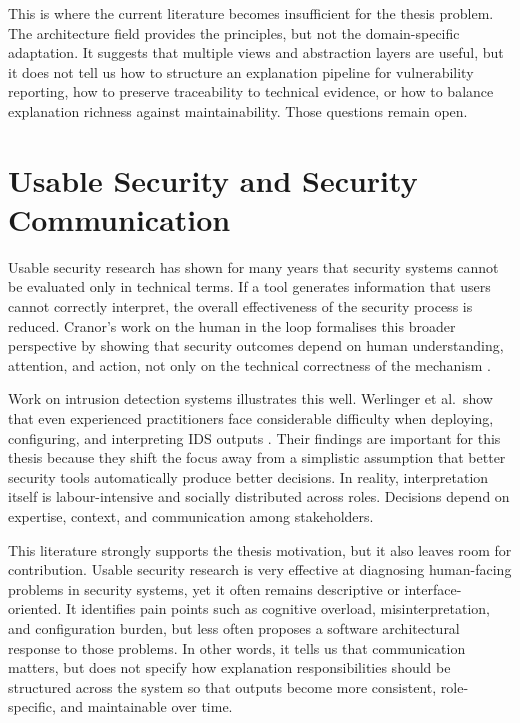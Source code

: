 This is where the current literature becomes insufficient for the thesis problem. The architecture field provides the principles, but not the domain-specific adaptation. It suggests that multiple views and abstraction layers are useful, but it does not tell us how to structure an explanation pipeline for vulnerability reporting, how to preserve traceability to technical evidence, or how to balance explanation richness against maintainability. Those questions remain open.

\section{Usable Security and Security Communication}

Usable security research has shown for many years that security systems cannot be evaluated only in technical terms. If a tool generates information that users cannot correctly interpret, the overall effectiveness of the security process is reduced. Cranor’s work on the human in the loop formalises this broader perspective by showing that security outcomes depend on human understanding, attention, and action, not only on the technical correctness of the mechanism \cite{cranor2008framework}.

Work on intrusion detection systems illustrates this well. Werlinger et al.\ show that even experienced practitioners face considerable difficulty when deploying, configuring, and interpreting IDS outputs \cite{werlinger2008ids}. Their findings are important for this thesis because they shift the focus away from a simplistic assumption that better security tools automatically produce better decisions. In reality, interpretation itself is labour-intensive and socially distributed across roles. Decisions depend on expertise, context, and communication among stakeholders.

This literature strongly supports the thesis motivation, but it also leaves room for contribution. Usable security research is very effective at diagnosing human-facing problems in security systems, yet it often remains descriptive or interface-oriented. It identifies pain points such as cognitive overload, misinterpretation, and configuration burden, but less often proposes a software architectural response to those problems. In other words, it tells us that communication matters, but does not specify how explanation responsibilities should be structured across the system so that outputs become more consistent, role-specific, and maintainable over time.

